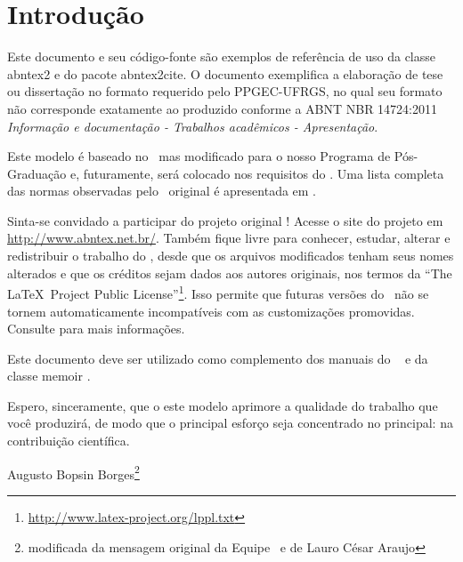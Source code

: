 \chapter{Introdução}\label{introducao}

Este documento e seu código-fonte são exemplos de referência de uso da classe
\textsf{abntex2} e do pacote \textsf{abntex2cite}. O documento 
exemplifica a elaboração de tese ou dissertação no formato requerido pelo PPGEC-UFRGS, no qual seu formato não corresponde exatamente ao produzido conforme a ABNT NBR 14724:2011 \emph{Informação e documentação
- Trabalhos acadêmicos - Apresentação}.

Este modelo é baseado no \abnTeX\ mas modificado para o nosso Programa de Pós-Graduação e, futuramente, será colocado nos requisitos do \abnTeX. Uma lista completa das normas
observadas pelo \abnTeX\ original é apresentada em .

Sinta-se convidado a participar do projeto original \abnTeX! Acesse o site do projeto em
\url{http://www.abntex.net.br/}. Também fique livre para conhecer,
estudar, alterar e redistribuir o trabalho do \abnTeX, desde que os arquivos
modificados tenham seus nomes alterados e que os créditos sejam dados aos
autores originais, nos termos da ``The \LaTeX\ Project Public
License''\footnote{\url{http://www.latex-project.org/lppl.txt}}. Isso permite que futuras versões do \abnTeX~não se tornem automaticamente
incompatíveis com as customizações promovidas. Consulte
 para mais informações.

Este documento deve ser utilizado como complemento dos manuais do \abnTeX\ 
\cite{abntex2classe,abntex2cite,abntex2cite-alf} e da classe \textsf{memoir}
\cite{memoir}. 

Espero, sinceramente, que o este modelo aprimore a qualidade do trabalho que
você produzirá, de modo que o principal esforço seja concentrado no principal:
na contribuição científica.


Augusto Bopsin Borges\footnote{modificada da mensagem original da Equipe \abnTeX~e de Lauro César Araujo}
  

